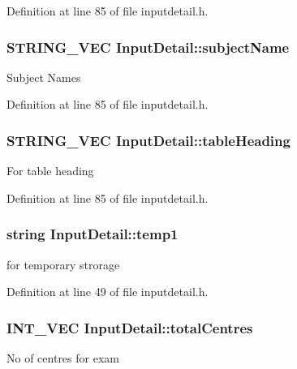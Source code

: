 \-Definition at line 85 of file inputdetail.\-h.

\hypertarget{classInputDetail_a860676e6e8b258a4cf6265e693194e93}{
\subsubsection[{subject\-Name}]{\setlength{\rightskip}{0pt plus 5cm}\-S\-T\-R\-I\-N\-G\-\_\-\-V\-E\-C {\bf \-Input\-Detail\-::subject\-Name}}}\label{db/d6e/classInputDetail_a860676e6e8b258a4cf6265e693194e93}
\-Subject \-Names 

\-Definition at line 85 of file inputdetail.\-h.

\hypertarget{classInputDetail_a9adc25a6c332855ee0c2dbd5fd71ca86}{
\subsubsection[{table\-Heading}]{\setlength{\rightskip}{0pt plus 5cm}\-S\-T\-R\-I\-N\-G\-\_\-\-V\-E\-C {\bf \-Input\-Detail\-::table\-Heading}}}\label{db/d6e/classInputDetail_a9adc25a6c332855ee0c2dbd5fd71ca86}
\-For table heading 

\-Definition at line 85 of file inputdetail.\-h.

\hypertarget{classInputDetail_aa5659e496977cc83f743725f6aaf2d6a}{
\subsubsection[{temp1}]{\setlength{\rightskip}{0pt plus 5cm}string {\bf \-Input\-Detail\-::temp1}}}\label{db/d6e/classInputDetail_aa5659e496977cc83f743725f6aaf2d6a}
for temporary strorage 

\-Definition at line 49 of file inputdetail.\-h.

\hypertarget{classInputDetail_a11f9eb0c33682bf3c9b1e2cac50ebaad}{
\subsubsection[{total\-Centres}]{\setlength{\rightskip}{0pt plus 5cm}\-I\-N\-T\-\_\-\-V\-E\-C {\bf \-Input\-Detail\-::total\-Centres}}}\label{db/d6e/classInputDetail_a11f9eb0c33682bf3c9b1e2cac50ebaad}
\-No of centres for exam 

